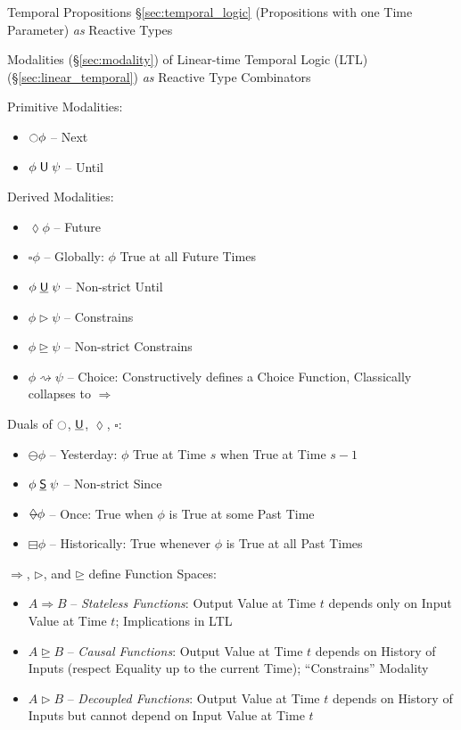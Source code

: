 Temporal Propositions \S\ref{sec:temporal_logic} (Propositions with
one Time Parameter) \emph{as} Reactive Types

Modalities (\S\ref{sec:modality}) of Linear-time Temporal Logic (LTL)
(\S\ref{sec:linear_temporal}) \emph{as} Reactive Type Combinators

Primitive Modalities:
\begin{itemize}
  \item $\ocircle \phi$ -- Next
  \item $\phi \;\mathsf{U}\; \psi$ -- Until
\end{itemize}

Derived Modalities:
\begin{itemize}
  \item $\lozenge \phi$ -- Future
  \item $\square \phi$ -- Globally: $\phi$ True at all Future Times
  \item $\phi \;\underline{\mathsf{U}}\; \psi$ -- Non-strict Until
  \item $\phi \rhd \psi$ -- Constrains
  \item $\phi \unrhd \psi$ -- Non-strict Constrains
  \item $\phi \rightsquigarrow \psi$ -- Choice: Constructively defines
    a Choice Function, Classically collapses to $\Rightarrow$
\end{itemize}

Duals of $\ocircle$, $\underline{\mathsf{U}}$, $\lozenge$, $\square$:
\begin{itemize}
  \item $\ominus \phi$ -- Yesterday: $\phi$ True at Time $s$ when True
    at Time $s - 1$
  \item $\phi \;\underline{\mathsf{S}}\; \psi$ -- Non-strict Since
  \item $\minlozenge \phi$ -- Once: True when $\phi$ is True at some
    Past Time
  \item $\boxminus \phi$ -- Historically: True whenever $\phi$ is True
    at all Past Times
\end{itemize}

$\Rightarrow$, $\rhd$, and $\unrhd$ define Function Spaces:
\begin{itemize}
  \item $A \Rightarrow B$ -- \emph{Stateless Functions}: Output Value
    at Time $t$ depends only on Input Value at Time $t$; Implications
    in LTL
  \item $A \unrhd B$ -- \emph{Causal Functions}: Output Value at Time
    $t$ depends on History of Inputs (respect Equality up to the
    current Time); ``Constrains'' Modality
  \item $A \rhd B$ -- \emph{Decoupled Functions}: Output Value at Time
    $t$ depends on History of Inputs but cannot depend on Input Value
    at Time $t$
\end{itemize}

